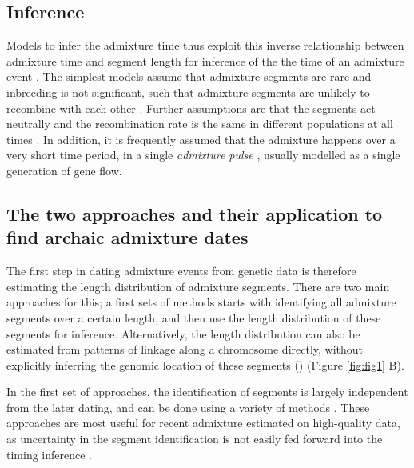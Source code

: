 \documentclass[]{article}
\begin{document}
\subsection{Inference}
Models to infer the admixture time thus exploit this inverse relationship between admixture time and segment length for inference of the  the time of an admixture event \citep{moorjani_history_2011,pugach_dating_2011,sankararaman_date_2012,loh_inferring_2013,sankararaman_combined_2016,pugach_gateway_2018,jacobs_multiple_2019,hellenthal_genetic_2014,pool_inference_2009,moorjani_history_2011,gravel_population_2012,liang_lengths_2014}. The simplest models assume that admixture segments are rare and inbreeding is not significant, such that admixture segments are unlikely to recombine with each other \citep{pool_inference_2009,liang_lengths_2014}. Further assumptions are that the segments act neutrally \citep{shchur_distribution_2019} and the recombination rate is the same in different populations at all times \citep{gravel_population_2012}. In addition, it is frequently assumed that the admixture happens over a very short time period, in a single \textit{admixture pulse} \citep{moorjani_history_2011}, usually modelled as a single generation of gene flow.


\subsection{The two approaches and their application to find archaic admixture dates}\label{the-two-approaches-and-their-application-to-find-archaic-admixture-dates}

The first step in dating admixture events from genetic data is therefore estimating the length distribution of admixture segments.  There are two main approaches for this; a first sets of methods starts with identifying all admixture segments over a certain length, and then use the length distribution of these segments for inference. Alternatively, the length distribution can also be estimated from patterns of linkage along a chromosome directly, without explicitly inferring the genomic location of these segments (\citep{chimusa_dating_2018}) (Figure \ref{fig:fig1} B).

 In the first set of approaches, the identification of segments is largely independent from the later dating, and can be done using a variety of methods \citep{racimo_signatures_2017,seguin_orlando_paleogenomics_2014,vernot_excavating_2016,sankararaman_combined_2016,skov_detecting_2018}. These approaches are most useful for recent admixture estimated on high-quality data, as uncertainty in the segment identification is not easily fed forward into the timing inference \citep{hellenthal_genetic_2014}.
\end{document}

